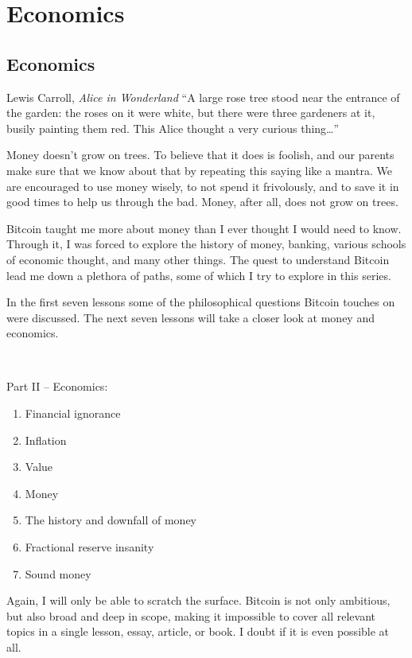 \part{Economics}
\label{ch:economics}
\chapter*{Economics}

\begin{chapquote}{Lewis Carroll, \textit{Alice in Wonderland}}
``A large rose tree stood near the entrance of the garden: the roses on it were
white, but there were three gardeners at it, busily painting them red. This
Alice thought a very curious thing\ldots''
\end{chapquote}

Money doesn’t grow on trees. To believe that it does is foolish, and our
parents make sure that we know about that by repeating this saying like a
mantra. We are encouraged to use money wisely, to not spend it frivolously,
and to save it in good times to help us through the bad. Money, after all,
does not grow on trees.

Bitcoin taught me more about money than I ever thought I would need to know.
Through it, I was forced to explore the history of money, banking, various
schools of economic thought, and many other things. The quest to understand
Bitcoin lead me down a plethora of paths, some of which I try to explore in
this series.

In the first seven lessons some of the philosophical questions Bitcoin touches
on were discussed. The next seven lessons will take a closer look at money and
economics.

~

Part II -- Economics:

\begin{enumerate}
  \item Financial ignorance
  \item Inflation
  \item Value
  \item Money
  \item The history and downfall of money
  \item Fractional reserve insanity
  \item Sound money
\end{enumerate}

Again, I will only be able to scratch the surface. Bitcoin is not only
ambitious, but also broad and deep in scope, making it impossible to cover all
relevant topics in a single lesson, essay, article, or book. I  doubt if it is
even possible at all.

